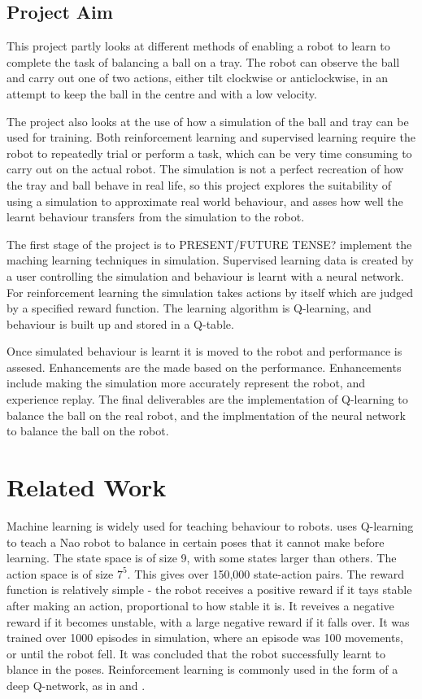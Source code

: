 \documentclass[12pt,a4paper]{article}
\begin{document}
\subsection{Project Aim}
This project partly looks at different methods of enabling a robot to learn to complete the task of balancing a ball on a tray. The robot can observe the ball and carry out one of two actions, either tilt clockwise or anticlockwise, in an attempt to keep the ball in the centre and with a low velocity. 

The project also looks at the use of how a simulation of the ball and tray can be used for training. Both reinforcement learning and supervised learning require the robot to repeatedly trial or perform a task, which can be very time consuming to carry out on the actual robot. The simulation is not a perfect recreation of how the tray and ball behave in real life, so this project explores the suitability of using a simulation to approximate real world behaviour, and asses how well the learnt behaviour transfers from the simulation to the robot. 

The first stage of the project is to PRESENT/FUTURE TENSE? implement the maching learning techniques in simulation. Supervised learning data is created by a user controlling the simulation and behaviour is learnt with a neural network. For reinforcement learning the simulation takes actions by itself which are judged by a specified reward function. The learning algorithm is Q-learning, and behaviour is built up and stored in a Q-table. 

Once simulated behaviour is learnt it is moved to the robot and performance is assesed. Enhancements are the made based on the performance. Enhancements include making the simulation more accurately represent the robot, and experience replay. The final deliverables are the implementation of Q-learning to balance the ball on the real robot, and the implmentation of the neural network to balance the ball on the robot.


\section{Related Work}
Machine learning is widely used for teaching behaviour to robots. \cite{nao_balance} uses Q-learning to teach a Nao robot to balance in certain poses that it cannot make before learning. The state space is of size 9, with some states larger than others. The action space is of size $7^5$. This gives over 150,000 state-action pairs. The reward function is relatively simple - the robot receives a positive reward if it tays stable after making an action, proportional to how stable it is. It reveives a negative reward if it becomes unstable, with a large negative reward if it falls over. It was trained over 1000 episodes in simulation, where an episode was 100 movements, or until the robot fell. It was concluded that the robot successfully learnt to blance in the poses. Reinforcement learning is commonly used in the form of a deep Q-network, as in \cite{sim_robot_arm} and \cite{robot_wheel}. 
\end{document}
